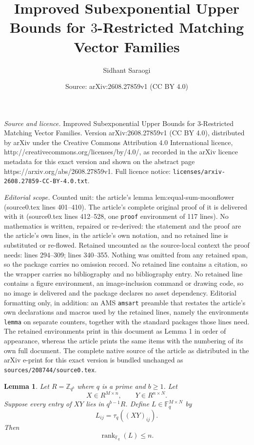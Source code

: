 \documentclass[10pt,a4paper]{amsart}
\title{Improved Subexponential Upper Bounds for $3$-Restricted Matching Vector Families}
\author{Sidhant Saraogi}
\date{Source: arXiv:2608.27859v1 (CC BY 4.0)}
\newtheorem{lemma}{Lemma}
\begin{document}
\maketitle

\noindent\emph{Source and licence.} Improved Subexponential Upper Bounds for $3$-Restricted Matching Vector Families. Version arXiv:2608.27859v1 (CC BY 4.0), distributed by arXiv under the Creative Commons Attribution 4.0 International licence, http://creativecommons.org/licenses/by/4.0/, as recorded in the arXiv licence metadata for this exact version and shown on the abstract page https://arxiv.org/abs/2608.27859v1. Full licence notice: \texttt{licenses/arxiv-2608.27859-CC-BY-4.0.txt}.\par\smallskip

\noindent\textit{Editorial scope.} Counted unit: the article's lemma lem:equal-sum-moonflower (source0.tex lines 401--410). The article's complete original proof of it is delivered with it (source0.tex lines 412--528, one \texttt{proof} environment of 117 lines). No mathematics is written, repaired or re-derived: the statement and the proof are the article's own lines, in the article's own notation, and no retained line is substituted or re-flowed.  Retained uncounted as the source-local context the proof needs: lines 294--309; lines 340--355.  Nothing was omitted from any retained span, so the package carries no omission record.  No retained line contains a citation, so the wrapper carries no bibliography and no bibliography entry.  No retained line contains a figure environment, an image-inclusion command or drawing code, so no image is delivered and the package declares no asset dependency.  Editorial formatting only, in addition: an AMS \texttt{amsart} preamble that restates the article's own declarations and macros used by the retained lines, namely the environments \texttt{lemma} on separate counters, together with the standard packages those lines need.  The retained environments print in this document as Lemma 1 in order of appearance, whereas the article prints the same items with the numbering of its own full document.  The complete native source of the article as distributed in the arXiv e-print for this exact version is bundled unchanged as \texttt{sources/208744/source0.tex}.
\begin{lemma} \label{lem:coeff_rank}
Let $R=\mathbb Z_{q^b}$ where $q$ is a prime and $b \geq 1$. Let
\[
X\in R^{M\times n},
\qquad
Y\in R^{n\times N}.
\]
Suppose every entry of $XY$ lies in $q^{b-1}R$. Define $L\in\mathbb F_q^{M\times N}$ by
\[
L_{ij}=\tau_q((XY)_{ij}).
\]
Then
\[
\operatorname{rank}_{\mathbb F_q}(L)\le n.
\]
\end{lemma}
\end{document}
